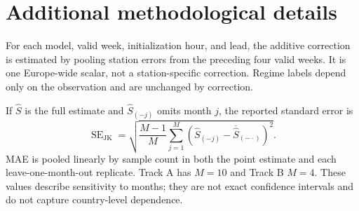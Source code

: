 \begin{table}[h]
\caption{Track B temperature MAE skill (\%), 1--48\,h, by regime.}
\label{tab:trackbtemp}
\centering\small\resizebox{\textwidth}{!}{}
\end{table}

\begin{table}[h]
\caption{Track B solar MAE skill (\%), 1--48\,h, by regime.}
\label{tab:trackbsolar}
\centering\small\resizebox{\textwidth}{!}{}
\end{table}

\section{Additional methodological details}\label{app:method}

For each model, valid week, initialization hour, and lead, the additive
correction is estimated by pooling station errors from the preceding four
valid weeks. It is one Europe-wide scalar, not a station-specific correction.
Regime labels depend only on the observation and are unchanged by correction.

If $\hat S$ is the full estimate and $\hat S_{(-j)}$ omits month $j$, the
reported standard error is
\[
\operatorname{SE}_{\mathrm{JK}} =
\sqrt{\frac{M-1}{M}\sum_{j=1}^{M}
\left(\hat S_{(-j)}-\overline{\hat S}_{(-\cdot)}\right)^2}.
\]
MAE is pooled linearly by sample count in both the point estimate and each
leave-one-month-out replicate. Track A has $M=10$ and Track B $M=4$.
These values describe sensitivity to months; they are not exact confidence
intervals and do not capture country-level dependence.
